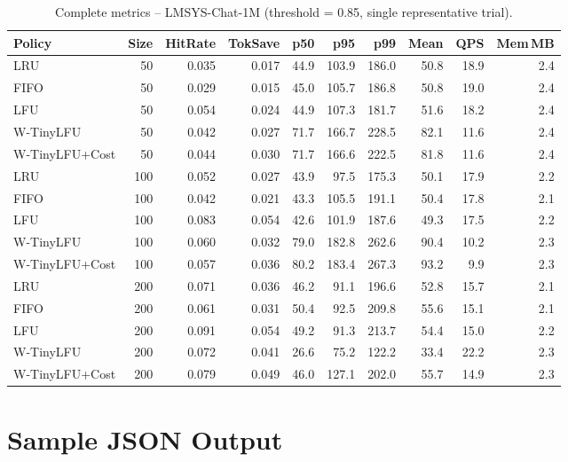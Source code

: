 \documentclass[11pt,a4paper]{article}
\begin{document}
\begin{table}[H]
\centering
\caption{Complete metrics -- LMSYS-Chat-1M (threshold = 0.85, single representative trial).}
\label{tab:full_lmsys085}
\scriptsize
\setlength{\tabcolsep}{3pt}
\begin{tabular}{@{} l r rrrr rr rr @{}}
\toprule
\textbf{Policy} & \textbf{Size} & \textbf{HitRate} & \textbf{TokSave} & \textbf{p50} & \textbf{p95} & \textbf{p99} & \textbf{Mean} & \textbf{QPS} & \textbf{Mem\,MB} \\
\midrule
LRU              & 50  & 0.035 & 0.017 & 44.9 & 103.9 & 186.0 & 50.8 & 18.9 & 2.4 \\
FIFO             & 50  & 0.029 & 0.015 & 45.0 & 105.7 & 186.8 & 50.8 & 19.0 & 2.4 \\
LFU              & 50  & 0.054 & 0.024 & 44.9 & 107.3 & 181.7 & 51.6 & 18.2 & 2.4 \\
W-TinyLFU        & 50  & 0.042 & 0.027 & 71.7 & 166.7 & 228.5 & 82.1 & 11.6 & 2.4 \\
W-TinyLFU+Cost   & 50  & 0.044 & 0.030 & 71.7 & 166.6 & 222.5 & 81.8 & 11.6 & 2.4 \\
\midrule
LRU              & 100 & 0.052 & 0.027 & 43.9 & 97.5  & 175.3 & 50.1 & 17.9 & 2.2 \\
FIFO             & 100 & 0.042 & 0.021 & 43.3 & 105.5 & 191.1 & 50.4 & 17.8 & 2.1 \\
LFU              & 100 & 0.083 & 0.054 & 42.6 & 101.9 & 187.6 & 49.3 & 17.5 & 2.2 \\
W-TinyLFU        & 100 & 0.060 & 0.032 & 79.0 & 182.8 & 262.6 & 90.4 & 10.2 & 2.3 \\
W-TinyLFU+Cost   & 100 & 0.057 & 0.036 & 80.2 & 183.4 & 267.3 & 93.2 & 9.9  & 2.3 \\
\midrule
LRU              & 200 & 0.071 & 0.036 & 46.2 & 91.1  & 196.6 & 52.8 & 15.7 & 2.1 \\
FIFO             & 200 & 0.061 & 0.031 & 50.4 & 92.5  & 209.8 & 55.6 & 15.1 & 2.1 \\
LFU              & 200 & 0.091 & 0.054 & 49.2 & 91.3  & 213.7 & 54.4 & 15.0 & 2.2 \\
W-TinyLFU        & 200 & 0.072 & 0.041 & 26.6 & 75.2  & 122.2 & 33.4 & 22.2 & 2.3 \\
W-TinyLFU+Cost   & 200 & 0.079 & 0.049 & 46.0 & 127.1 & 202.0 & 55.7 & 14.9 & 2.3 \\
\bottomrule
\end{tabular}
\end{table}

\section{Sample JSON Output}
\end{document}
